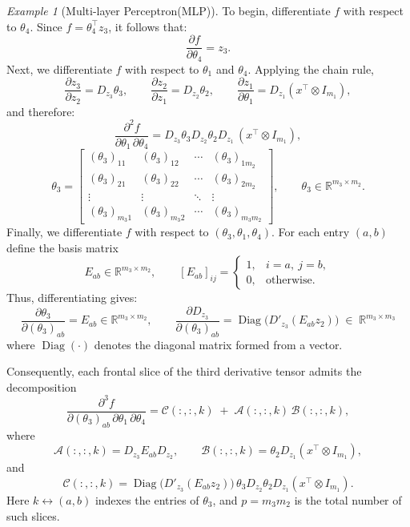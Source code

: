 \documentclass{article}
\theoremstyle{plain}
\theoremstyle{definition}
\theoremstyle{remark}
\newtheorem{example}[theorem]{Example}
\begin{document}
\begin{example}[Multi-layer Perceptron(MLP)]
To begin, differentiate $f$ with respect to $\theta_{4}$. Since $f = \theta_{4}^{\top} z_{3}$, it follows that:
\[
\frac{\partial f}{\partial \theta_{4}} = z_{3}.
\]
Next, we differentiate $f$ with respect to $\theta_{1}$ and $\theta_{4}$.  
Applying the chain rule,
\[
\frac{\partial z_{3}}{\partial z_{2}} = D_{z_{3}}\theta_{3},\qquad
\frac{\partial z_{2}}{\partial z_{1}} = D_{z_{2}}\theta_{2},\qquad
\frac{\partial z_{1}}{\partial \theta_{1}}
= D_{z_{1}} (x^{\top} \otimes I_{m_{1}}),
\]
and therefore:
\[
\frac{\partial^{2} f}{\partial \theta_{1}\, \partial \theta_{4}}
=
D_{z_{3}}\theta_{3} D_{z_{2}}\theta_{2} D_{z_{1}}\,
(x^{\top}\otimes I_{m_{1}}),
\]
\[
\theta_{3} =
\begin{bmatrix}
(\theta_{3})_{11} & (\theta_{3})_{12} & \cdots & (\theta_{3})_{1m_{2}}\\[3pt]
(\theta_{3})_{21} & (\theta_{3})_{22} & \cdots & (\theta_{3})_{2m_{2}}\\
\vdots & \vdots & \ddots & \vdots \\
(\theta_{3})_{m_{3}1} & (\theta_{3})_{m_{3}2} & \cdots & (\theta_{3})_{m_{3}m_{2}}
\end{bmatrix},
\qquad
\theta_{3} \in \mathbb{R}^{m_{3}\times m_{2}}.
\]
Finally, we differentiate $f$ with respect to $(\theta_{3}, \theta_{1}, \theta_{4})$.  
For each entry $(a,b)$ define the basis matrix
\[
E_{ab} \in \mathbb{R}^{m_{3}\times m_{2}},
\qquad
[E_{ab}]_{ij} =
\begin{cases}
1, & i=a,\ j=b,\\
0, & \text{otherwise}.
\end{cases}
\]
Thus, differentiating gives:
\[
\frac{\partial \theta_{3}}{\partial (\theta_{3})_{ab}} = E_{ab} 
\in \mathbb{R}^{m_3 \times m_2},
\qquad
\frac{\partial D_{z_3}}{\partial (\theta_3)_{ab}}
= \operatorname{Diag}\!\big(D'_{z_3}(E_{ab} z_2)\big)
\;\in\; \mathbb{R}^{m_3 \times m_3}
\]
where $\operatorname{Diag}(\cdot)$ denotes the diagonal matrix formed from a vector.

Consequently, each frontal slice of the third derivative tensor admits the decomposition
\begin{equation}
\label{eq:mlp-third-slice}
\frac{\partial^{3} f}{\partial(\theta_{3})_{ab}\,\partial\theta_{1}\,\partial\theta_{4}}
=
\mathcal{C}(:,:,k)
\;+\;
\mathcal{A}(:,:,k)\,\mathcal{B}(:,:,k),
\end{equation}
where
\[
\mathcal{A}(:,:,k)=D_{z_{3}}E_{ab}D_{z_{2}},\qquad
\mathcal{B}(:,:,k)=\theta_{2}D_{z_{1}}(x^{\top}\otimes I_{m_{1}}),
\]
and
\[
\mathcal{C}(:,:,k)
=
\operatorname{Diag}\!\big(D'_{z_{3}}(E_{ab}z_{2})\big)\,
\theta_{3}D_{z_{2}}\theta_{2}D_{z_{1}}
(x^{\top}\otimes I_{m_{1}}).
\]
Here $k\leftrightarrow(a,b)$ indexes the entries of $\theta_3$, and
$p=m_3 m_2$ is the total number of such slices.


\end{example}
\end{document}
